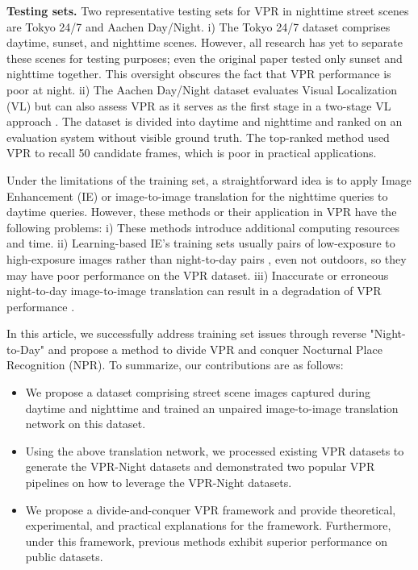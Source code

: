 \documentclass[10pt,twocolumn,letterpaper]{article}
\begin{document}
\noindent \textbf{Testing sets.}
 Two representative testing sets for VPR in nighttime street scenes are Tokyo 24/7 \cite{247_dataset} and Aachen Day/Night. i) The Tokyo 24/7 dataset comprises daytime, sunset, and nighttime scenes. However, all research \cite{netvlad, cosplace, dvg, sfrs, sare} has yet to separate these scenes for testing purposes; even the original paper \cite{247_dataset} tested only sunset and nighttime together. This oversight obscures the fact that VPR performance is poor at night. ii) The Aachen Day/Night dataset evaluates Visual Localization (VL) but can also assess VPR as it serves as the first stage in a two-stage VL approach \cite{superglue, hloc, vl_benchmarking}. The dataset is divided into daytime and nighttime and ranked on an evaluation system without visible ground truth. The top-ranked method used VPR to recall 50 candidate frames, which is poor in practical applications.

Under the limitations of the training set, a straightforward idea is to apply Image Enhancement (IE) or image-to-image translation for the nighttime queries to daytime queries. However, these methods or their application in VPR have the following problems: i) These methods introduce additional computing resources and time. ii) Learning-based IE's training sets usually pairs of low-exposure to high-exposure images rather than night-to-day pairs \cite{lol_dataset}, even not outdoors, so they may have poor performance on the VPR dataset.  iii) Inaccurate or erroneous night-to-day image-to-image translation can result in a degradation of VPR performance \cite{todaygan}.

In this article, we successfully address training set issues through reverse "Night-to-Day" and propose a method to divide VPR and conquer Nocturnal Place Recognition (NPR). To summarize, our contributions are as follows:

\begin{itemize}
  \item We propose a dataset comprising street scene images captured during daytime and nighttime and trained an unpaired image-to-image translation network on this dataset.
  \item Using the above translation network, we processed existing VPR datasets to generate the VPR-Night datasets and demonstrated two popular VPR pipelines on how to leverage the VPR-Night datasets.
  \item We propose a divide-and-conquer VPR framework and provide theoretical, experimental, and practical explanations for the framework. Furthermore, under this framework, previous methods exhibit superior performance on public datasets.
\end{itemize}
\end{document}
